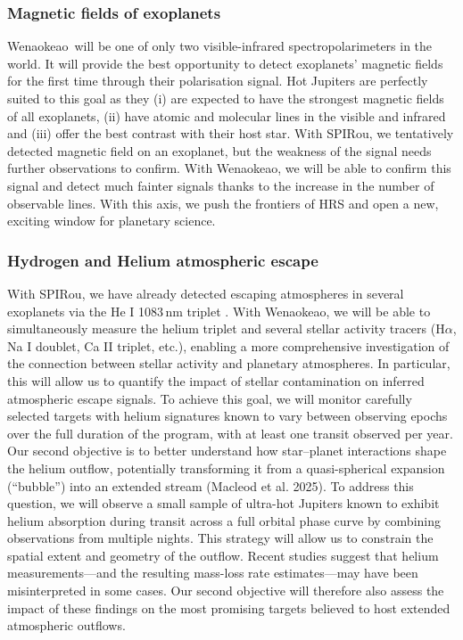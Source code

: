 \documentclass[
    traditabstract,
    longauth,
    onecolumn,
]{aa}
\def \spi{SPIRou}
\def \wena{Wenaokeao}
\begin{document}
\subsubsection*{Magnetic fields of exoplanets}
\wena\ will be one of only two visible-infrared spectropolarimeters in the world. It will provide the best opportunity to detect exoplanets' magnetic fields for the first time through their polarisation signal. Hot Jupiters are perfectly suited to this goal as they (i) are expected to have the strongest magnetic fields of all exoplanets, (ii) have atomic and molecular lines in the visible and infrared and (iii) offer the best contrast with their host star. With SPIRou, we tentatively detected magnetic field on an exoplanet, but the weakness of the signal needs further observations to confirm. With \wena, we will be able to confirm this signal and detect much fainter signals thanks to the increase in the number of observable lines. With this axis, we push the frontiers of HRS and open a new, exciting window for planetary science.

\subsubsection*{Hydrogen and Helium atmospheric escape}
With \spi, we have already detected escaping atmospheres in several exoplanets via the He I 1083\,nm triplet \citep{allart_homogeneous_2023,masson_probing_2024}. With \wena, we will be able to simultaneously measure the helium triplet and several stellar activity tracers (H$\alpha$, Na I doublet, Ca II triplet, etc.), enabling a more comprehensive investigation of the connection between stellar activity and planetary atmospheres. In particular, this will allow us to quantify the impact of stellar contamination on inferred atmospheric escape signals. To achieve this goal, we will monitor carefully selected targets with helium signatures known to vary between observing epochs over the full duration of the program, with at least one transit observed per year. Our second objective is to better understand how star–planet interactions shape the helium outflow, potentially transforming it from a quasi-spherical expansion (“bubble”) into an extended stream (Macleod et al. 2025). To address this question, we will observe a small sample of ultra-hot Jupiters known to exhibit helium absorption during transit across a full orbital phase curve by combining observations from multiple nights. This strategy will allow us to constrain the spatial extent and geometry of the outflow. Recent studies \citep{zhang_giant_2023,gully-santiago_large_2024,allart_complex_2025} suggest that helium measurements—and the resulting mass-loss rate estimates—may have been misinterpreted in some cases. Our second objective will therefore also assess the impact of these findings on the most promising targets believed to host extended atmospheric outflows.
\end{document}
